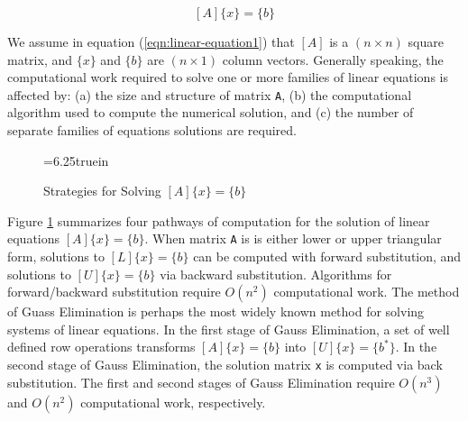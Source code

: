 \begin{equation}
\left[ A \right] \lbrace x \rbrace = \lbrace b \rbrace
\label{eqn:linear-equation1}
\end{equation}

\vspace{0.05 in}\noindent
We assume in equation (\ref{eqn:linear-equation1}) that
$\left[ A \right]$ is a $(n \times n)$ square matrix,
and $\lbrace x \rbrace$ and $\lbrace b \rbrace$ are $(n \times 1)$ column vectors.
Generally speaking, the computational work required to solve one or more families
of linear equations is affected by:
(a) the size and structure of matrix {\tt A},
(b) the computational algorithm used to compute the numerical solution,
and (c) the number of separate families of equations solutions are required.

\vspace{0.15 in}
\begin{figure} [h]
\epsfxsize=6.25truein
\centerline{}
\caption{Strategies for Solving $\left[ A \right] \lbrace x \rbrace = \lbrace b \rbrace$}
\label{fig:solution-stragies}
\end{figure}

\vspace{0.15 in}\noindent
Figure \ref{fig:solution-stragies} summarizes four pathways of computation 
for the solution of linear equations $\left[ A \right] \lbrace x \rbrace = \lbrace b \rbrace$.
When matrix {\tt A} is is either lower or upper triangular form,
solutions to $\left[ L \right] \lbrace x \rbrace = \lbrace b \rbrace$ can
be computed with forward substitution,
and solutions to $\left[ U \right] \lbrace x \rbrace = \lbrace b \rbrace$
via backward substitution. Algorithms for forward/backward
substitution require $O(n^2)$ computational work.
The method of Guass Elimination is perhaps the most
widely known method for solving systems of linear equations.
In the first stage of Gauss Elimination, a set of well defined
row operations transforms $\left[ A \right] \lbrace x \rbrace = \lbrace b \rbrace$
into $\left[ U \right] \lbrace x \rbrace = \lbrace b^{*} \rbrace$.
In the second stage of Gauss Elimination, the solution matrix {\tt x} is
computed via back substitution. The first and second stages of Gauss Elimination
require $O(n^3)$ and $O(n^2)$ computational work, respectively.

